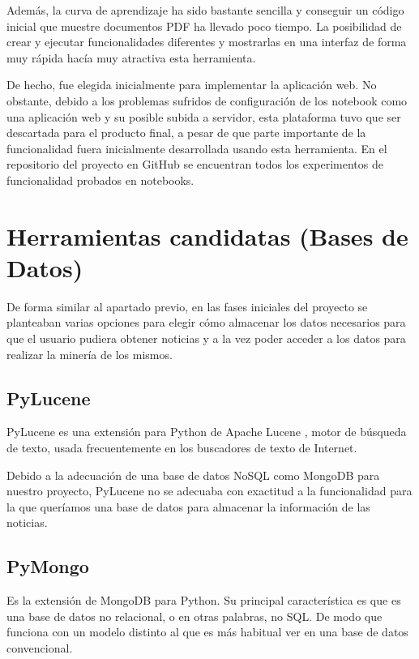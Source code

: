 Además, la curva de aprendizaje ha sido bastante sencilla y conseguir un código inicial que muestre documentos PDF ha llevado poco tiempo. La posibilidad de crear y ejecutar funcionalidades diferentes y mostrarlas en una interfaz de forma muy rápida hacía muy atractiva esta herramienta.

De hecho, fue elegida inicialmente para implementar la aplicación web. No obstante, debido a los problemas sufridos de configuración de los notebook como una aplicación web y su posible subida a servidor, esta plataforma tuvo que ser descartada para el producto final, a pesar de que parte importante de la funcionalidad fuera inicialmente desarrollada usando esta herramienta. En el repositorio del proyecto en GitHub se encuentran todos los experimentos de funcionalidad probados en notebooks.


\bigskip

\section{Herramientas candidatas (Bases de Datos)}
De forma similar al apartado previo, en las fases iniciales del proyecto se planteaban varias opciones para elegir c\'omo almacenar los datos necesarios para que el usuario pudiera obtener noticias y a la vez poder acceder a los datos para realizar la minería de los mismos.

\subsection{PyLucene}

PyLucene \cite{pylucene:homepage} es una extensión para Python de Apache Lucene \cite{wiki:lucene}, motor de búsqueda de texto, usada frecuentemente en los buscadores de texto de Internet.

Debido a la adecuación de una base de datos NoSQL como MongoDB para nuestro proyecto, PyLucene no se adecuaba con exactitud a la funcionalidad para la que queríamos una base de datos para almacenar la información de las noticias.

\subsection{PyMongo}

Es la extensión de MongoDB \cite{Chodorow:2010:MDG:1941134} para Python. Su principal característica es que es una base de datos no relacional, o en otras palabras, no SQL. De modo que funciona con un modelo distinto al que es más habitual ver en una base de datos convencional. 


